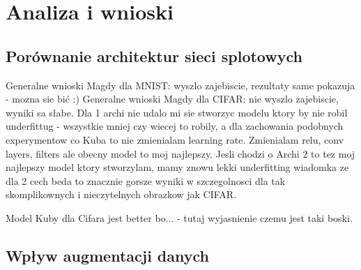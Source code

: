 \documentclass[10pt]{article}
\begin{document}
\pagebreak
\section{Analiza i wnioski}\label{sec:wyniki}
\subsection*{Porównanie architektur sieci splotowych}
Generalne wnioski Magdy dla MNIST: wyszlo zajebiscie, rezultaty same pokazuja - mozna sie bić :)
Generalne wnioski Magdy dla CIFAR: nie wyszlo zajebiscie, wyniki sa słabe. Dla 1 archi nie udalo mi sie stworzyc modelu ktory by nie robil underfittug - wszystkie mniej czy wiecej to robily, a dla zachowania podobnych experymentow co Kuba to nie zmienialam learning rate. Zmienialam relu, conv layers, filters ale obecny model to moj najlepszy.
Jesli chodzi o Archi 2 to tez moj najlepszy model ktory stworzylam, mamy znowu lekki underfitting
wiadomka ze dla 2 cech beda to znacznie gorsze wyniki w szczegolnosci dla tak skomplikownych i nieczytelnych obrazkow jak CIFAR.

Model Kuby dla Cifara jest better bo... - tutaj wyjasnienie czemu jest taki boski.
\subsection*{Wpływ augmentacji danych}
\end{document}
